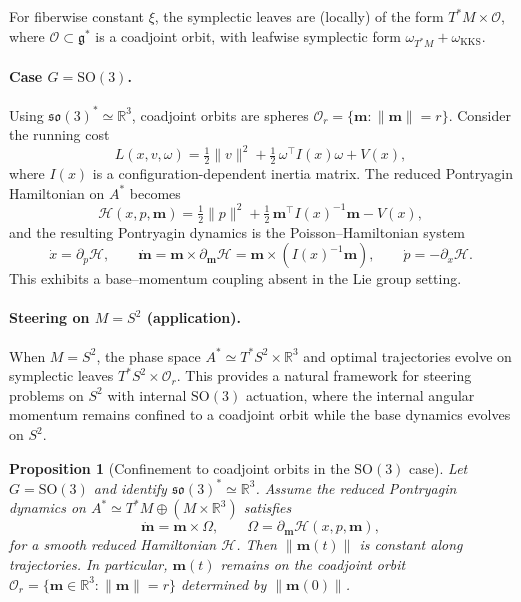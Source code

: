 \documentclass{article}
\newtheorem{proposition}[theorem]{Proposition}
\begin{document}
\begin{itemize}
For fiberwise constant $\xi$, the symplectic leaves are (locally) of the form $T^*M\times\mathcal O$, where $\mathcal O\subset\mathfrak g^*$ is a coadjoint orbit, with leafwise symplectic form $\omega_{T^*M}+\omega_{\mathrm{KKS}}$.

\paragraph{Case $G=\mathrm{SO}(3)$.}
Using $\mathfrak{so}(3)^*\simeq\mathbb R^3$, coadjoint orbits are spheres $\mathcal O_r=\{\mathbf m:\|\mathbf m\|=r\}$.
Consider the running cost
\[
L(x,v,\omega)=\tfrac12\|v\|^2+\tfrac12\,\omega^\top I(x)\omega+V(x),
\]
where $I(x)$ is a configuration-dependent inertia matrix.
The reduced Pontryagin Hamiltonian on $A^*$ becomes
\[
\mathcal H(x,p,\mathbf m)=\tfrac12\|p\|^2+\tfrac12\,\mathbf m^\top I(x)^{-1}\mathbf m - V(x),
\]
and the resulting Pontryagin dynamics is the Poisson--Hamiltonian system
\[
\dot x=\partial_p\mathcal H,\qquad
\dot{\mathbf m}=\mathbf m\times \partial_{\mathbf m}\mathcal H=\mathbf m\times(I(x)^{-1}\mathbf m),\qquad
\dot p=-\partial_x\mathcal H.
\]
This exhibits a base--momentum coupling absent in the Lie group setting.

\paragraph{Steering on $M=S^2$ (application).}
When $M=S^2$, the phase space $A^*\simeq T^*S^2\times \mathbb R^3$ and optimal trajectories evolve on symplectic leaves $T^*S^2\times \mathcal O_r$.
This provides a natural framework for steering problems on $S^2$ with internal $\mathrm{SO}(3)$ actuation, where the internal angular momentum remains confined to a coadjoint orbit while the base dynamics evolves on $S^2$.
\begin{proposition}[Confinement to coadjoint orbits in the $\mathrm{SO}(3)$ case]{\label{CCO}}
Let $G=\mathrm{SO}(3)$ and identify $\mathfrak{so}(3)^*\simeq\mathbb R^3$.
Assume the reduced Pontryagin dynamics on $A^*\simeq T^*M\oplus(M\times\mathbb R^3)$ satisfies
\[
\dot{\mathbf m}=\mathbf m\times \Omega,\qquad \Omega=\partial_{\mathbf m}\mathcal H(x,p,\mathbf m),
\]
for a smooth reduced Hamiltonian $\mathcal H$.
Then $\|\mathbf m(t)\|$ is constant along trajectories. In particular, $\mathbf m(t)$ remains on the coadjoint orbit
$\mathcal O_r=\{\mathbf m\in\mathbb R^3:\|\mathbf m\|=r\}$ determined by $\|\mathbf m(0)\|$.
\end{proposition}


\end{itemize}
\end{document}

